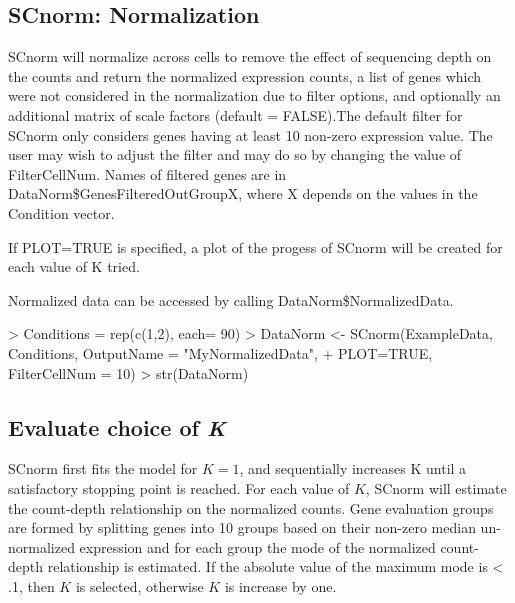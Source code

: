 \documentclass{article}
\begin{document}
  \subsection{SCnorm: Normalization}
\label{sec:Normalization}
SCnorm will normalize across cells to remove the effect of sequencing depth on the counts and return the normalized expression counts, a list of genes which were not considered in the normalization due to filter options, and optionally an additional matrix of scale factors (default = FALSE).The default filter for SCnorm only considers genes having at least 10 non-zero expression value. The user may wish to adjust the filter and may do so by changing the value of FilterCellNum. Names of filtered genes are in DataNorm\$GenesFilteredOutGroupX, where X depends on the values in the Condition vector.

If PLOT=TRUE is specified, a plot of the progess of SCnorm will be created for each value of K tried.

Normalized data can be accessed by calling DataNorm\$NormalizedData.

\begin{Schunk}
\begin{Sinput}
> Conditions = rep(c(1,2), each= 90)
> DataNorm <- SCnorm(ExampleData, Conditions, OutputName = "MyNormalizedData",
+                      PLOT=TRUE, FilterCellNum = 10)
> str(DataNorm)
\end{Sinput}
\end{Schunk}

\subsection{Evaluate choice of \textit{K}}
\label{sec:NormalizationK}

SCnorm first fits the model for $K = 1$, and sequentially increases K until a satisfactory stopping point is reached. For each value of $K$, SCnorm will estimate the count-depth relationship on the normalized counts. Gene evaluation groups are formed by splitting genes into 10 groups based on their non-zero median un-normalized expression and for each group the mode of the normalized count-depth relationship is estimated. If the absolute value of the maximum mode is < .1, then $K$ is selected, otherwise $K$ is increase by one.
\end{document}
